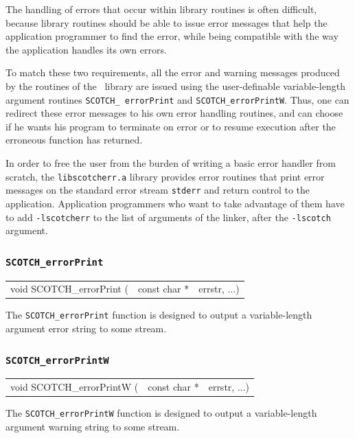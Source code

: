 The handling of errors that occur within library routines is
often difficult, because library routines should be able to issue
error messages that help the application programmer to find the
error, while being compatible with the way the application handles
its own errors.

To match these two requirements, all the error and warning messages
produced by the routines of the \libscotch\ library are issued using
the user-definable variable-length argument routines {\tt SCOTCH\_\lbt
error\lbt Print} and {\tt SCOTCH\_\lbt error\lbt PrintW}. Thus, one
can redirect these error messages to his own error handling routines,
and can choose if he wants his program to terminate on error or to
resume execution after the erroneous function has returned.

In order to free the user from the burden of writing a basic error
handler from scratch, the {\tt libscotcherr.a} library provides error
routines that print error messages on the standard error stream
{\tt stderr} and return control to the application. Application
programmers who want to take advantage of them have to add
{\tt -lscotcherr} to the list of arguments of the linker, after
the {\tt -lscotch} argument.

\subsubsection{{\tt SCOTCH\_errorPrint}}
\label{sec-lib-func-errorprint}

\begin{itemize}
\progsyn

{\tt\begin{tabular}{l@{}ll}
void SCOTCH\_errorPrint ( & const char * & errstr, ...)
\end{tabular}}

\progdes

The {\tt SCOTCH\_errorPrint} function is designed to output a
variable-length argument error string to some stream.
\end{itemize}

\subsubsection{{\tt SCOTCH\_errorPrintW}}

\begin{itemize}
\progsyn

{\tt\begin{tabular}{l@{}ll}
void SCOTCH\_errorPrintW ( & const char * & errstr, ...)
\end{tabular}}

\progdes

The {\tt SCOTCH\_errorPrintW} function is designed to output a
variable-length argument warning string to some stream.
\end{itemize}

